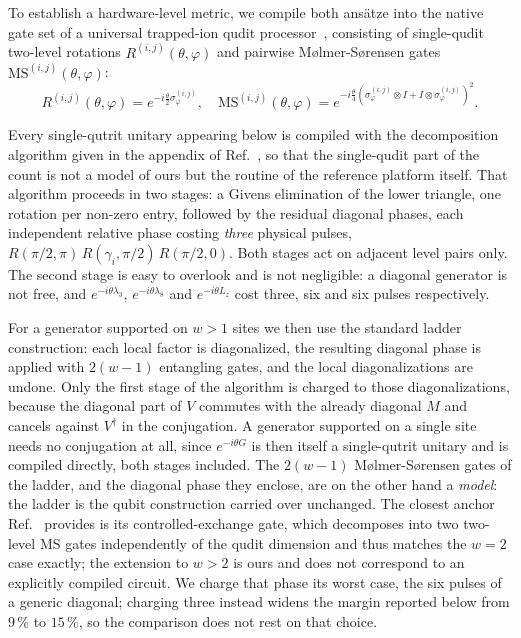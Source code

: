 To establish a hardware-level metric, we compile both ans\"atze into the native gate set of a universal trapped-ion qudit processor~\cite{RingbauerNatPhys2022}, consisting of single-qudit two-level rotations $R^{(i,j)}(\theta,\varphi)$ and pairwise M\o{}lmer-S\o{}rensen gates $\mathrm{MS}^{(i,j)}(\theta,\varphi)$:
\begin{equation}
R^{(i,j)}(\theta,\varphi) = e^{-i \frac{\theta}{2} \sigma_{\varphi}^{(i,j)}}, \quad
\mathrm{MS}^{(i,j)}(\theta,\varphi) = e^{-i \frac{\theta}{4} \left( \sigma_{\varphi}^{(i,j)} \otimes I + I \otimes \sigma_{\varphi}^{(i,j)} \right)^2}.
\end{equation}

Every single-qutrit unitary appearing below is compiled with the decomposition algorithm given in the appendix of Ref.~\cite{RingbauerNatPhys2022}, so that the single-qudit part of the count is not a model of ours but the routine of the reference platform itself. That algorithm proceeds in two stages: a Givens elimination of the lower triangle, one rotation per non-zero entry, followed by the residual diagonal phases, each independent relative phase costing \emph{three} physical pulses, $R(\pi/2,\pi)\,R(\gamma_i,\pi/2)\,R(\pi/2,0)$. Both stages act on adjacent level pairs only. The second stage is easy to overlook and is not negligible: a diagonal generator is not free, and $e^{-i\theta\lambda_3}$, $e^{-i\theta\lambda_8}$ and $e^{-i\theta L_z}$ cost three, six and six pulses respectively.

For a generator supported on $w>1$ sites we then use the standard ladder construction: each local factor is diagonalized, the resulting diagonal phase is applied with $2(w-1)$ entangling gates, and the local diagonalizations are undone. Only the first stage of the algorithm is charged to those diagonalizations, because the diagonal part of $V$ commutes with the already diagonal $M$ and cancels against $V^\dagger$ in the conjugation. A generator supported on a single site needs no conjugation at all, since $e^{-i\theta G}$ is then itself a single-qutrit unitary and is compiled directly, both stages included. The $2(w-1)$ M\o{}lmer-S\o{}rensen gates of the ladder, and the diagonal phase they enclose, are on the other hand a \emph{model}: the ladder is the qubit construction carried over unchanged. The closest anchor Ref.~\cite{RingbauerNatPhys2022} provides is its controlled-exchange gate, which decomposes into two two-level MS gates independently of the qudit dimension and thus matches the $w=2$ case exactly; the extension to $w>2$ is ours and does not correspond to an explicitly compiled circuit. We charge that phase its worst case, the six pulses of a generic diagonal; charging three instead widens the margin reported below from $9\,\%$ to $15\,\%$, so the comparison does not rest on that choice.

